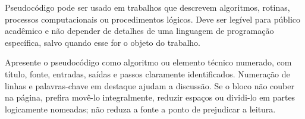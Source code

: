 Pseudocódigo pode ser usado em trabalhos que descrevem algoritmos, rotinas, processos computacionais ou procedimentos lógicos. Deve ser legível para público acadêmico e não depender de detalhes de uma linguagem de programação específica, salvo quando esse for o objeto do trabalho.

Apresente o pseudocódigo como algoritmo ou elemento técnico numerado, com título, fonte, entradas, saídas e passos claramente identificados. Numeração de linhas e palavras-chave em destaque ajudam a discussão. Se o bloco não couber na página, prefira movê-lo integralmente, reduzir espaços ou dividi-lo em partes logicamente nomeadas; não reduza a fonte a ponto de prejudicar a leitura.

